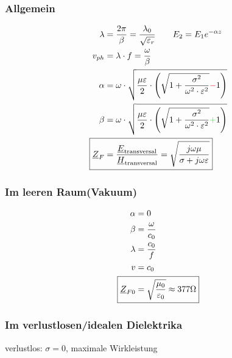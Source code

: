 \subsubsection{Allgemein}
\begin{align*}
    \lambda                 & = \dfrac{2\pi}{\beta} = \frac{\lambda_0}{\sqrt{\varepsilon_r}} \qquad E_2 = E_1 e^{-\alpha z}                                               \\
    v_{ph}                  & = \lambda\cdot f = \dfrac{\omega}{\beta}                                                                                                    \\
    \alpha                  & = \omega \cdot \sqrt{\dfrac{\mu \varepsilon}{2}\cdot \left(\sqrt{1+\dfrac{\sigma^2}{\omega^2\cdot\varepsilon^2}}{\color{red}{-}}1\right)}   \\
    \beta                   & = \omega \cdot \sqrt{\dfrac{\mu \varepsilon}{2}\cdot \left(\sqrt{1+\dfrac{\sigma^2}{\omega^2\cdot\varepsilon^2}}{\color{green}{+}}1\right)} \\
    \Aboxed{\underline{Z}_F & = \dfrac{\underline{E}_\text{transversal}}{\underline{H}_\text{transversal}} = \sqrt{\dfrac{j\omega\mu}{\sigma+j\omega\varepsilon}}}        \\
\end{align*}

\subsubsection{Im leeren Raum(Vakuum)}
\begin{align*}
    \alpha                     & = 0                                                    \\
    \beta                      & = \dfrac{\omega}{c_0}                                  \\
    \lambda                    & = \dfrac{c_0}{f}                                       \\
    v                          & = c_0                                                  \\
    \Aboxed{\underline{Z}_{F0} & = \sqrt{\dfrac{\mu_0}{\varepsilon_0}}\approx377\Omega}
\end{align*}

\subsubsection{Im verlustlosen/idealen Dielektrika}
verlustlos: $\sigma =0$, maximale Wirkleistung

